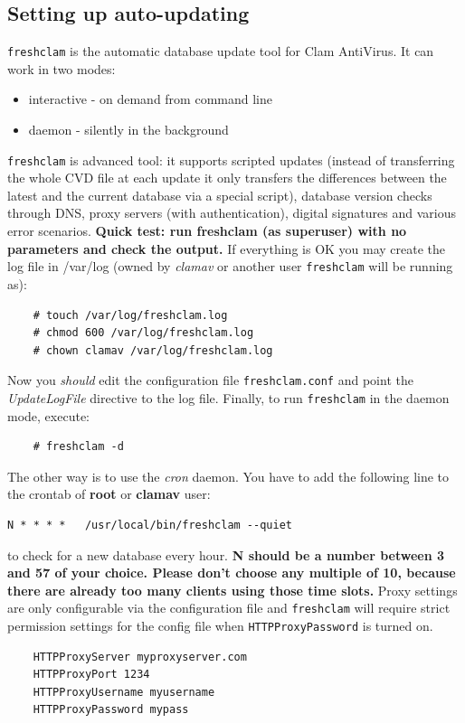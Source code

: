 \documentclass[a4paper,titlepage,12pt]{article}
\begin{document}
    \subsection{Setting up auto-updating}\label{conf:freshclam}
    \verb+freshclam+ is the automatic database update tool for Clam AntiVirus.
    It can work in two modes:
    \begin{itemize}
	\item interactive - on demand from command line
	\item daemon - silently in the background
    \end{itemize}
    \verb+freshclam+ is advanced tool: it supports scripted updates (instead
    of transferring the whole CVD file at each update it only transfers the
    differences between the latest and the current database via a special
    script), database version checks through DNS, proxy servers (with
    authentication), digital signatures and various error scenarios.
    \textbf{Quick test: run freshclam (as superuser) with no parameters
    and check the output.} If everything is OK you may create the log file in
    /var/log (owned by \emph{clamav} or another user \verb+freshclam+ will be
    running as):
    \begin{verbatim}
	# touch /var/log/freshclam.log
	# chmod 600 /var/log/freshclam.log
	# chown clamav /var/log/freshclam.log
    \end{verbatim}
    Now you \emph{should} edit the configuration file \verb+freshclam.conf+
    and point the \emph{UpdateLogFile} directive to the log file. Finally, to
    run \verb+freshclam+ in the daemon mode, execute:
    \begin{verbatim}
	# freshclam -d
    \end{verbatim}
    The other way is to use the \emph{cron} daemon. You have to add the
    following line to the crontab of \textbf{root} or \textbf{clamav} user:
    {\small
    \begin{verbatim}
N * * * *	/usr/local/bin/freshclam --quiet
    \end{verbatim}}
    \noindent to check for a new database every hour. \textbf{N should be a
    number between 3 and 57 of your choice. Please don't choose any multiple
    of 10, because there are already too many clients using those time slots.}
    Proxy settings are only configurable via the configuration file and
    \verb+freshclam+ will require strict permission settings for the config
    file when \verb+HTTPProxyPassword+ is turned on.
    \begin{verbatim}
	HTTPProxyServer myproxyserver.com
	HTTPProxyPort 1234
	HTTPProxyUsername myusername
	HTTPProxyPassword mypass
    \end{verbatim}
\end{document}

